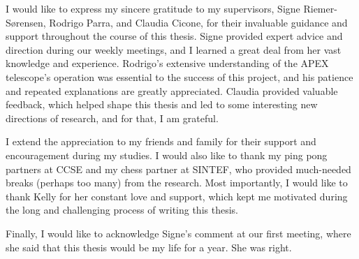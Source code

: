 I would like to express my sincere gratitude to my supervisors, Signe Riemer-Sørensen, Rodrigo Parra, and Claudia Cicone,
for their invaluable guidance and support throughout the course of this thesis.
Signe provided expert advice and direction during our weekly meetings, and I learned a great deal from her vast knowledge and experience.
Rodrigo's extensive understanding of the APEX telescope's operation was essential to the success of this project,
and his patience and repeated explanations are greatly appreciated. Claudia provided valuable feedback,
which helped shape this thesis and led to some interesting new directions of research, and for that, I am grateful.

I extend the appreciation to my friends and family for their support and encouragement during my studies.
I would also like to thank my ping pong partners at CCSE and my chess partner at SINTEF,
who provided much-needed breaks (perhaps too many) from the research.
Most importantly, I would like to thank Kelly for her constant love and support,
which kept me motivated during the long and challenging process of writing this thesis.

Finally, I would like to acknowledge Signe's comment at our first meeting, where she said that this thesis would be my life for a year.
She was right.
